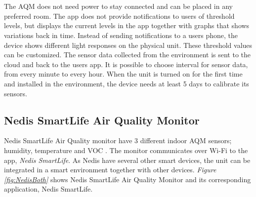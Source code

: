 \\\\
The AQM does not need power to stay connected and can be placed in any preferred room. The app does not provide notifications to users of threshold levels, but displays the current levels in the app together with graphs that shows variations back in time. Instead of sending notifications to a users phone, the device shows different light responses on the physical unit. These threshold values can be customized. The sensor data collected from the environment is sent to the cloud and back to the users app. It is possible to choose interval for sensor data, from every minute to every hour. When the unit is turned on for the first time and installed in the environment, the device needs at least 5 days to calibrate its sensors. 

\subsection{Nedis SmartLife Air Quality Monitor}
Nedis SmartLife Air Quality monitor have 3 different indoor AQM sensors; humidity, temperature and VOC \cite{NedisDevice}. The monitor communicates over Wi-Fi to the app, \textit{Nedis SmartLife}. As Nedis have several other smart devices, the unit can be integrated in a smart environment together with other devices. 
\textit{Figure \ref{fig:NedisBoth}} shows Nedis SmartLife Air Quality Monitor and its corresponding application, Nedis SmartLife. 
